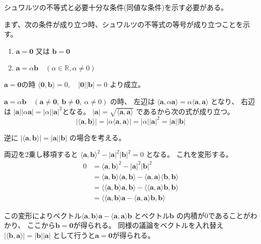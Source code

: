 \documentclass[12pt,b5paper]{ltjsarticle}
\begin{document}
\dotfill

シュワルツの不等式と必要十分な条件(同値な条件)を示す必要がある。

まず、次の条件が成り立つ時、シュワルツの不等式の等号が成り立つことを示す。
\begin{enumerate}
 \item $\bm{a}=\bm{0}$ 又は $\bm{b}=\bm{0}$
 \item $\bm{a}=\alpha\bm{b} \quad (\alpha\in\mathbb{R},\alpha\ne 0)$
\end{enumerate}

$\bm{a}=\bm{0}$の時
$\langle \bm{0}, \bm{b} \rangle =0, \quad
\lvert \bm{0} \rvert \lvert \bm{b} \rvert =0$
より成立。

$\bm{a}=\alpha\bm{b} \quad (\bm{a}\ne\bm{0}, \ \bm{b}\ne \bm{0},\ \alpha\ne 0)$
の時、
左辺は
$\langle \bm{a}, \alpha\bm{a} \rangle = \alpha \langle \bm{a}, \bm{a} \rangle$
となり、
右辺は
$\lvert \bm{a} \rvert \lvert \alpha\bm{a} \rvert
= \lvert \alpha \rvert \lvert \bm{a} \rvert^2$となる。
$\lvert \bm{a} \rvert = \sqrt{\langle \bm{a}, \bm{a} \rangle}$
であるから次の式が成り立つ。
\begin{equation}
 \lvert \langle \bm{a}, \bm{b} \rangle \rvert
  =\lvert \alpha \langle \bm{a}, \bm{a} \rangle \rvert
  = \lvert \alpha \rvert \lvert \bm{a} \rvert^2
  = \lvert \bm{a} \rvert \lvert \bm{b} \rvert
\end{equation}


逆に
$\lvert \langle \bm{a}, \bm{b} \rangle \rvert
  = \lvert \bm{a} \rvert \lvert \bm{b} \rvert$
の場合を考える。

両辺を2乗し移項すると
$\langle \bm{a}, \bm{b} \rangle^2
- \lvert \bm{a} \rvert^2 \lvert \bm{b} \rvert^2 =0$
となる。
これを変形する。
\begin{align}
 0 &= \langle \bm{a}, \bm{b} \rangle^2
 - \lvert \bm{a} \rvert^2 \lvert \bm{b} \rvert^2\\
 &= \langle \bm{a}, \bm{b} \rangle \langle \bm{a}, \bm{b} \rangle
 - \langle \bm{a}, \bm{a} \rangle \langle \bm{b}, \bm{b} \rangle\\
 & = \langle \langle \bm{a}, \bm{b} \rangle \bm{a}, \bm{b} \rangle
 - \langle \langle \bm{a}, \bm{a} \rangle \bm{b}, \bm{b} \rangle\\
 & = \langle \langle \bm{a}, \bm{b} \rangle \bm{a}
 - \langle \bm{a}, \bm{a} \rangle \bm{b}, \bm{b} \rangle
\end{align}

この変形によりベクトル$\langle \bm{a}, \bm{b} \rangle \bm{a}
 - \langle \bm{a}, \bm{a} \rangle \bm{b}$
とベクトル$\bm{b}$
の内積が$0$であることがわかり、
ここから$\bm{b}=\bm{0}$が得られる。
同様の議論をベクトルを入れ替え
$\lvert \langle \bm{b}, \bm{a} \rangle \rvert
  = \lvert \bm{b} \rvert \lvert \bm{a} \rvert$
として行うと$\bm{a}=\bm{0}$が得られる。
\end{document}

